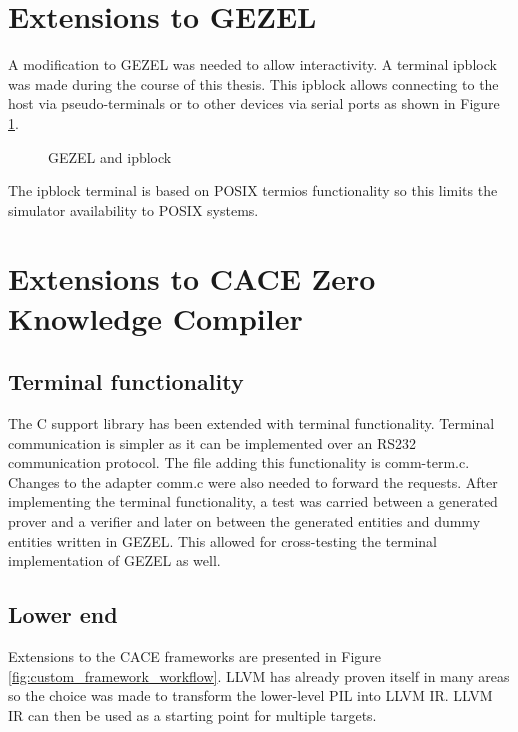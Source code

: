 \filbreak

\section{Extensions to GEZEL}

A modification to GEZEL was needed to allow interactivity. A terminal
ipblock was made during the course of this thesis. This ipblock allows
connecting to the host via pseudo-terminals or to other devices via
serial ports as shown in Figure \ref{fig:gezel_ipblock}.

\begin{figure}[hbt!]
  \centering
  \caption{GEZEL and ipblock}
  \label{fig:gezel_ipblock}
\end{figure}

The ipblock terminal is based on POSIX termios functionality so this
limits the simulator availability to POSIX systems.

\section{Extensions to CACE Zero Knowledge Compiler}

\subsection{Terminal functionality}

The C support library has been extended with terminal
functionality. Terminal communication is simpler as it can be
implemented over an RS232 communication protocol. The file adding this
functionality is comm-term.c. Changes to the adapter comm.c were also
needed to forward the requests. After implementing the terminal
functionality, a test was carried between a generated prover and a
verifier and later on between the generated entities and dummy
entities written in GEZEL. This allowed for cross-testing the terminal
implementation of GEZEL as well.

\subsection{Lower end}

Extensions to the CACE frameworks are presented in Figure
\ref{fig:custom_framework_workflow}. LLVM has already proven itself in
many areas so the choice was made to transform the lower-level PIL
into LLVM IR. LLVM IR can then be used as a starting point for
multiple targets. 

